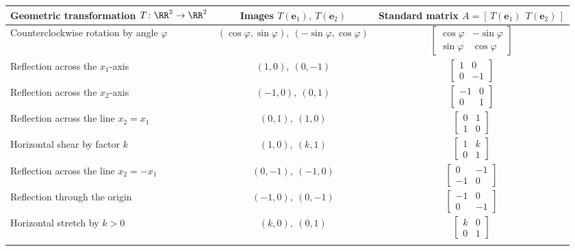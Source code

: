 \documentclass[10pt]{scrartcl}
\newcommand{\vv}[1]{\mathbf{#1}}
\begin{document}
\begin{center}
\renewcommand{\arraystretch}{1.15}
\begin{tabular}{@{}lcc@{}}
\toprule
Geometric transformation $T\colon\RR^2\to\RR^2$ & Images $T(\vv e_1),\ T(\vv e_2)$ & Standard matrix $A=[\,T(\vv e_1)\ \ T(\vv e_2)\,]$ \\
\midrule\addlinespace[5pt]
Counterclockwise rotation by angle $\varphi$ & $(\cos\varphi,\sin\varphi),\ (-\sin\varphi,\cos\varphi)$ & $\begin{bmatrix}\cos\varphi&-\sin\varphi\\\sin\varphi&\cos\varphi\end{bmatrix}$ \\\addlinespace[7pt]
Reflection across the $x_1$-axis & $(1,0),\ (0,-1)$ & $\begin{bmatrix}1&0\\0&-1\end{bmatrix}$ \\\addlinespace[7pt]
Reflection across the $x_2$-axis & $(-1,0),\ (0,1)$ & $\begin{bmatrix}-1&0\\0&1\end{bmatrix}$ \\\addlinespace[7pt]
Reflection across the line $x_2=x_1$ & $(0,1),\ (1,0)$ & $\begin{bmatrix}0&1\\1&0\end{bmatrix}$ \\\addlinespace[7pt]
Horizontal shear by factor $k$ & $(1,0),\ (k,1)$ & $\begin{bmatrix}1&k\\0&1\end{bmatrix}$ \\\addlinespace[7pt]
Reflection across the line $x_2=-x_1$ & $(0,-1),\ (-1,0)$ & $\begin{bmatrix}0&-1\\-1&0\end{bmatrix}$ \\\addlinespace[7pt]
Reflection through the origin & $(-1,0),\ (0,-1)$ & $\begin{bmatrix}-1&0\\0&-1\end{bmatrix}$ \\\addlinespace[7pt]
Horizontal stretch by $k>0$ & $(k,0),\ (0,1)$ & $\begin{bmatrix}k&0\\0&1\end{bmatrix}$ \\\addlinespace[7pt]

\end{tabular}
\end{center}
\end{document}
